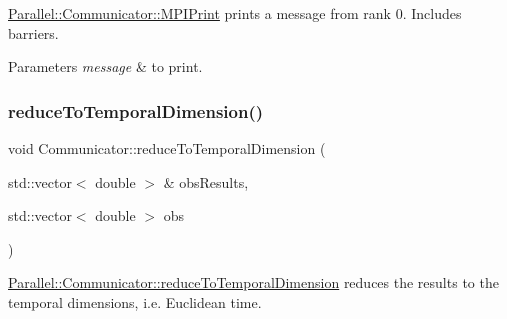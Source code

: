 \mbox{\hyperlink{class_parallel_1_1_communicator_a34a1d27c0e2b2b101b97a53734dbc4f8}{Parallel\+::\+Communicator\+::\+M\+P\+I\+Print}} prints a message from rank 0. Includes barriers. 


\begin{DoxyParams}{Parameters}
{\em message} & to print. \\
\hline
\end{DoxyParams}
\mbox{\label{class_parallel_1_1_communicator_a5d42989e7a3022de6042e3503aa35346}} 
\subsubsection{\texorpdfstring{reduceToTemporalDimension()}{reduceToTemporalDimension()}}
{\footnotesize\ttfamily void Communicator\+::reduce\+To\+Temporal\+Dimension (\begin{DoxyParamCaption}\item[{std\+::vector$<$ double $>$ \&}]{obs\+Results,  }\item[{std\+::vector$<$ double $>$}]{obs }\end{DoxyParamCaption})\hspace{0.3cm}{\ttfamily [static]}}



\mbox{\hyperlink{class_parallel_1_1_communicator_a5d42989e7a3022de6042e3503aa35346}{Parallel\+::\+Communicator\+::reduce\+To\+Temporal\+Dimension}} reduces the results to the temporal dimensions, i.\+e. Euclidean time. 


